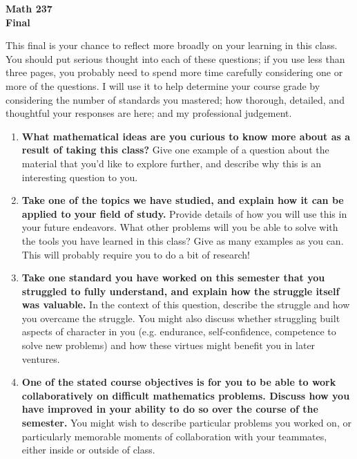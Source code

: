 \documentclass{article}
\begin{document}
\begin{center}
\textbf{Math 237 \\ Final}
\end{center}

This final is your chance to reflect more broadly on your learning in this class. You should put serious thought into each of these questions; if you use less than three pages, you probably need to spend more time carefully considering one or more of the questions.  I will use it to help determine your course grade by considering the number of standards you mastered; how thorough, detailed, and thoughtful your responses are here; and my professional judgement.

\begin{enumerate}
\item \textbf{What mathematical ideas are you curious to know more about as a result of taking this class?}  Give one example of a question about the material that you'd like to explore further, and describe why this is an interesting question to you.

\item \textbf{Take one of the topics we have studied, and explain how it can be applied to your field of study.}  Provide details of how you will use this in your future endeavors. What other problems will you be able to solve with the tools you have learned in this class? Give as many examples as you can. This will probably require you to do a bit of research!

\item \textbf{Take one standard you have worked on this semester that you struggled to fully understand, and explain how the struggle itself was valuable.}  In the context of this question, describe the struggle and how you overcame the struggle. You might also discuss whether struggling built aspects of character in you (e.g. endurance, self-confidence, competence to solve new problems) and how these virtues might benefit you in later ventures.

\item \textbf{One of the stated course objectives is for you to be able to work collaboratively on difficult mathematics problems. Discuss how you have improved in your ability to do so over the course of the semester.} You might wish to describe particular problems you worked on, or particularly memorable moments of collaboration with your teammates, either inside or outside of class. 


\end{enumerate}
\end{document}
